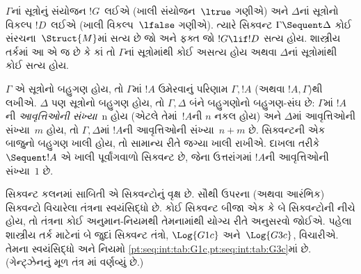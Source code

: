 $\Gamma$નાં સૂત્રોનું સંયોજન $!G$~લઈએ
(ખાલી સંયોજન~$\ltrue$ ગણીએ)
અને $\Delta$નાં સૂત્રોનો વિકલ્પ $!D$~લઈએ
(ખાલી વિકલ્પ~$\lfalse$ ગણીએ).
ત્યારે સિક્વન્ટ $\Gamma \Sequent \Delta$
કોઈ સંરચના~$\Struct{M}$માં સત્ય છે
જો અને ફક્ત જો $!G \lif !D$ સત્ય હોય.
શાસ્ત્રીય તર્કમાં આ એ જ છે કે
કાં તો $\Gamma$નાં સૂત્રોમાંથી કોઈ અસત્ય હોય
અથવા $\Delta$નાં સૂત્રોમાંથી કોઈ સત્ય હોય.

$\Gamma$ એ સૂત્રોનો બહુગણ હોય,
તો $\Gamma$માં $!A$ ઉમેરવાનું પરિણામ
$\Gamma, !A$ (અથવા $!A, \Gamma$)થી લખીએ.
$\Delta$ પણ સૂત્રોનો બહુગણ હોય,
તો $\Gamma, \Delta$ બંને બહુગણોનો બહુગણ-સંઘ છે:
$\Gamma$માં $!A$ની \emph{આવૃત્તિઓની સંખ્યા}~n હોય
(એટલે તેમાં~$!A$ની $n$ નકલ હોય)
અને $\Delta$માં આવૃત્તિઓની સંખ્યા~$m$ હોય,
તો $\Gamma, \Delta$માં $!A$ની આવૃત્તિઓની સંખ્યા~$n+m$ છે.
સિક્વન્ટની એક બાજુનો બહુગણ ખાલી હોય,
તો સામાન્ય રીતે જગ્યા ખાલી રાખીએ.
દાખલા તરીકે $\Sequent !A$ એ ખાલી પૂર્વાંગવાળો સિક્વન્ટ છે,
જેના ઉત્તરાંગમાં $!A$ની આવૃત્તિઓની સંખ્યા~$1$ છે.

સિક્વન્ટ કલનમાં સાબિતી એ સિક્વન્ટોનું વૃક્ષ છે.
સૌથી ઉપરના (અથવા આરંભિક) સિક્વન્ટો
વિચારેલા તંત્રના સ્વયંસિદ્ધો છે.
કોઈ સિક્વન્ટ બીજા એક કે બે સિક્વન્ટોની નીચે હોય,
તો તંત્રના કોઈ અનુમાન-નિયમથી તેમનામાંથી યોગ્ય રીતે અનુસરવો જોઈએ.
પહેલા શાસ્ત્રીય તર્ક માટેનાં બે જુદાં સિક્વન્ટ તંત્રો,
$\Log{G1c}$ અને~$\Log{G3c}$, વિચારીએ.
તેમના સ્વયંસિદ્ધો અને નિયમો
\cref{pt:seq:int:tab:G1c,pt:seq:int:tab:G3c}માં છે.
 (ગેન્ટ્ઝેનનું મૂળ તંત્ર 
માં વર્ણવ્યું છે.)

\begingroup
\makeatletter{}\makeatother

\label{guunit:OLP-0704}


